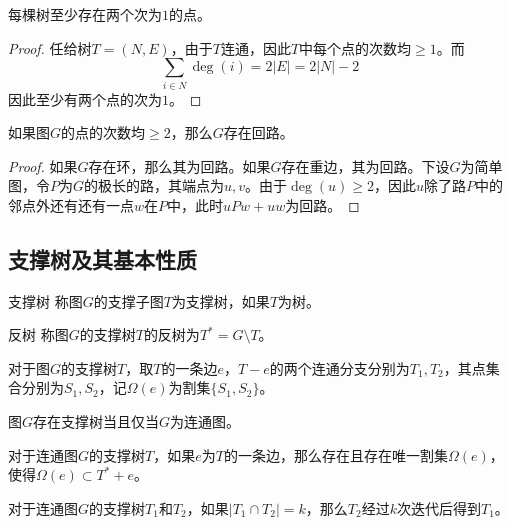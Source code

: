\documentclass[lang = cn, scheme = chinese, thmcnt = section]{elegantbook}
\newcommand{\sub}{\subset}             %
\begin{document}
\begin{theorem}
	每棵树至少存在两个次为$1$的点。
\end{theorem}

\begin{proof}
	任给树$T=(N,E)$，由于$T$连通，因此$T$中每个点的次数均$\ge 1$。而%
	$$
	\sum_{i\in N}\deg(i)
	=2|E|
	=2|N|-2
	$$
	因此至少有两个点的次为$1$。
\end{proof}

\begin{theorem}
	如果图$G$的点的次数均$\ge 2$，那么$G$存在回路。
\end{theorem}

\begin{proof}
	如果$G$存在环，那么其为回路。如果$G$存在重边，其为回路。下设$G$为简单图，令$P$为$G$的极长的路，其端点为$u,v$。由于$\deg(u)\ge 2$，因此$u$除了路$P$中的邻点外还有还有一点$w$在$P$中，此时$uPw+uw$为回路。
\end{proof}

\subsection{支撑树及其基本性质}

\begin{definition}{支撑树}
	称图$G$的支撑子图$T$为支撑树，如果$T$为树。
\end{definition}

\begin{definition}{反树}
	称图$G$的支撑树$T$的反树为$T^*=G\setminus T$。
\end{definition}

\begin{definition}
	对于图$G$的支撑树$T$，取$T$的一条边$e$，$T-e$的两个连通分支分别为$T_1,T_2$，其点集合分别为$S_1,S_2$，记$\Omega(e)$为割集$\{ S_1,S_2 \}$。
\end{definition}

\begin{theorem}
	图$G$存在支撑树当且仅当$G$为连通图。
\end{theorem}

\begin{theorem}
	对于连通图$G$的支撑树$T$，如果$e$为$T$的一条边，那么存在且存在唯一割集$\Omega(e)$，使得$\Omega(e)\sub T^*+e$。
\end{theorem}

\begin{theorem}
	对于连通图$G$的支撑树$T_1$和$T_2$，如果$|T_1\cap T_2|=k$，那么$T_2$经过$k$次迭代后得到$T_1$。
\end{theorem}
\end{document}
